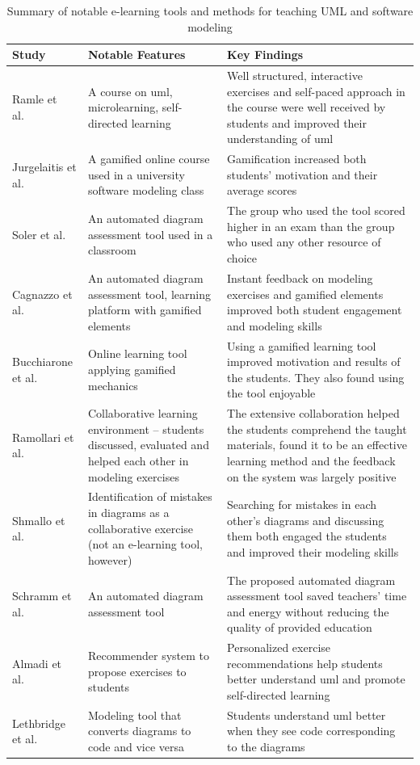 \begin{table}[H]
\centering
\small
\begin{tabularx}{\textwidth}{@{}l X X@{}}
\toprule
\textbf{Study} & \textbf{Notable Features} & \textbf{Key Findings} \\
\midrule
Ramle et al.~\cite{ramle2021uml} & A course on \ac{uml}, microlearning, self-directed learning & Well structured, interactive exercises and self-paced approach in the course were well received by students and improved their understanding of \ac{uml} \\
Jurgelaitis et al.~\cite{jurgelaitis2019implementing} & A gamified online course used in a university software modeling class & Gamification increased both students' motivation and their average scores \\
Soler et al.~\cite{soler2010formative} & An automated diagram assessment tool used in a classroom & The group who used the tool scored higher in an exam than the group who used any other resource of choice \\
Cagnazzo et al.~\cite{cagnazzo2023umlegend} & An automated diagram assessment tool, learning platform with gamified elements & Instant feedback on modeling exercises and gamified elements improved both student engagement and modeling skills \\
Bucchiarone et al.~\cite{BUCCHIARONE2023102974} & Online learning tool applying gamified mechanics & Using a gamified learning tool improved motivation and results of the students. They also found using the tool enjoyable \\
Ramollari et al.~\cite{trapp2011collaborative} & Collaborative learning environment – students discussed, evaluated and helped each other in modeling exercises & The extensive collaboration helped the students comprehend the taught materials, found it to be an effective learning method and the feedback on the system was largely positive \\
Shmallo et al.~\cite{shmallo2020constructive} & Identification of mistakes in diagrams as a collaborative exercise (not an e-learning tool, however) & Searching for mistakes in each other's diagrams and discussing them both engaged the students and improved their modeling skills \\
Schramm et al.~\cite{schramm2012teaching} & An automated diagram assessment tool & The proposed automated diagram assessment tool saved teachers' time and energy without reducing the quality of provided education \\
Almadi et al.~\cite{almadi2018cdrs} & Recommender system to propose exercises to students & Personalized exercise recommendations help students better understand \ac{uml} and promote self-directed learning \\
Lethbridge et al.~\cite{umple} & Modeling tool that converts diagrams to code and vice versa & Students understand \ac{uml} better when they see code corresponding to the diagrams \\
\bottomrule
\end{tabularx}
\caption{Summary of notable e-learning tools and methods for teaching UML and software modeling}
\label{tab:uml-elearning-studies}
\end{table}

\newpage

